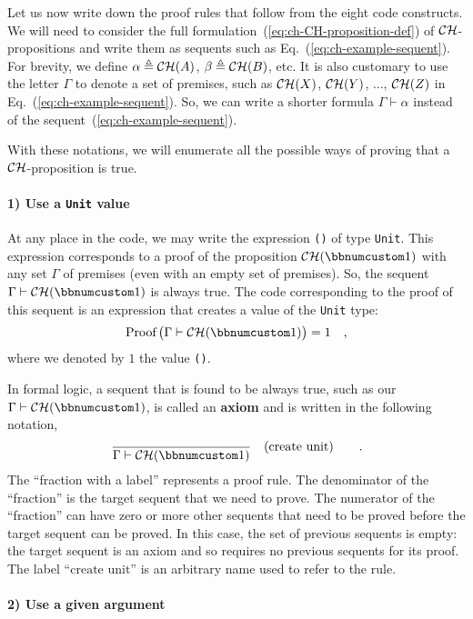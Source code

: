 Let us now write down the proof rules that follow from the eight code
constructs. We will need to consider the full formulation~(\ref{eq:ch-CH-proposition-def})
of ${\cal CH}$-propositions and write them as sequents such as Eq.~(\ref{eq:ch-example-sequent}).
For brevity, we define $\alpha\triangleq{\cal CH}(A)$, $\beta\triangleq{\cal CH}(B)$,
etc. It is also customary to use the letter $\Gamma$ to denote a
set of premises, such as ${\cal CH}(X)$, ${\cal CH}(Y)$, ..., ${\cal CH}(Z)$
in Eq.~(\ref{eq:ch-example-sequent}). So, we can write a shorter
formula $\Gamma\vdash\alpha$ instead of the sequent~(\ref{eq:ch-example-sequent}).

With these notations, we will enumerate all the possible ways of proving
that a ${\cal CH}$-proposition is true. 

\paragraph{1) Use a \lstinline!Unit! value}

At any place in the code, we may write the expression \lstinline!()!
of type \lstinline!Unit!. This expression corresponds to a proof
of the proposition ${\cal CH}(\bbnum 1)$ with any set $\Gamma$ of
premises (even with an empty set of premises). So, the sequent $\Gamma\vdash{\cal CH}(\bbnum 1)$
is always true. The code corresponding to the proof of this sequent
is an expression that creates a value of the \lstinline!Unit! type:
\[
\text{Proof}\,\big(\Gamma\vdash{\cal CH}(\bbnum 1)\big)=1\quad,
\]
where we denoted by $1$ the value \lstinline!()!.

In formal logic, a sequent that is found to be always true, such as
our $\Gamma\vdash{\cal CH}(\bbnum 1)$, is called an \textbf{axiom}
and is written in the following notation,
\[
\frac{}{\Gamma\vdash{\cal CH}(\bbnum 1)}\quad(\text{create unit})\quad\quad.
\]
The \textsf{``}fraction with a label\textsf{''} represents a proof rule. The denominator
of the \textsf{``}fraction\textsf{''} is the target sequent that we need to prove.
The numerator of the \textsf{``}fraction\textsf{''} can have zero or more other sequents
that need to be proved before the target sequent can be proved. In
this case, the set of previous sequents is empty: the target sequent
is an axiom and so requires no previous sequents for its proof. The
label \textsf{``}$\text{create unit}$\textsf{''} is an arbitrary name used to refer
to the rule.

\paragraph{2) Use a given argument}

